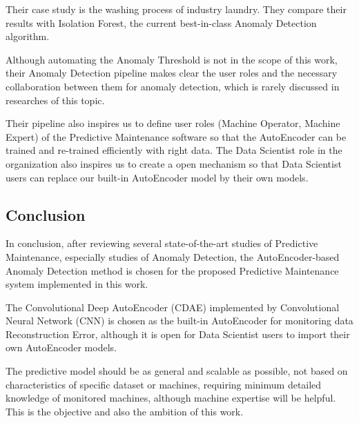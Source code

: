 Their case study is the washing process of industry laundry. They compare their results with Isolation Forest, the current best-in-class Anomaly Detection algorithm.

Although automating the Anomaly Threshold is not in the scope of this work, their Anomaly Detection pipeline makes clear the user roles and the necessary collaboration between them for anomaly detection, which is rarely discussed in researches of this topic. 

Their pipeline also inspires us to define user roles (Machine Operator, Machine Expert) of the Predictive Maintenance software so that the AutoEncoder can be trained and re-trained efficiently with right data. The Data Scientist role in the organization also inspires us to create a open mechanism so that Data Scientist users can replace our built-in AutoEncoder model by their own models.

\subsection{Conclusion}

In conclusion, after reviewing several state-of-the-art studies of Predictive Maintenance, especially studies of Anomaly Detection, the AutoEncoder-based Anomaly Detection method is chosen for the proposed Predictive Maintenance system implemented in this work.

The Convolutional Deep AutoEncoder (CDAE) implemented by Convolutional Neural Network (CNN) is chosen as the built-in AutoEncoder for monitoring data Reconstruction Error, although it is open for Data Scientist users to import their own AutoEncoder models.

The predictive model should be as general and scalable as possible, not based on characteristics of specific dataset or machines, requiring minimum detailed knowledge of monitored machines, although machine expertise will be helpful. This is the objective and also the ambition of this work.
